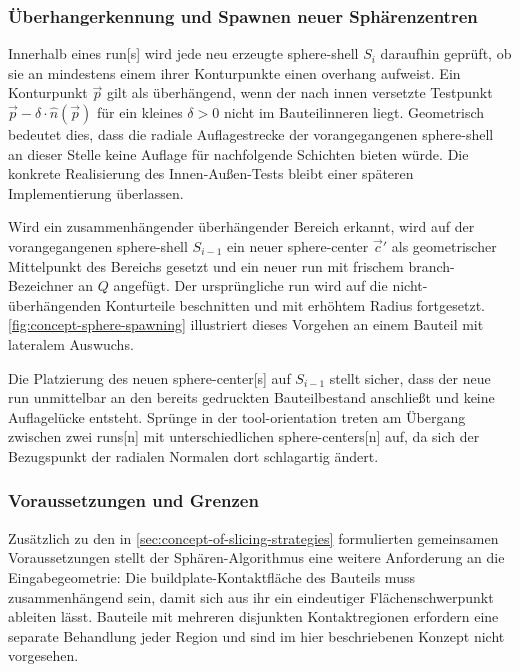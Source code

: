             \subsubsection{Überhangerkennung und Spawnen neuer Sphärenzentren}\label{subsubsec:concept-sphere-overhang-detection} 
                Innerhalb eines \gls{run}[s] wird jede neu erzeugte \gls{sphere-shell} $S_i$ daraufhin geprüft, ob sie an mindestens einem ihrer Konturpunkte einen \gls{overhang} aufweist.
                Ein Konturpunkt $\vec{p}$ gilt als überhängend, wenn der nach innen versetzte Testpunkt $\vec{p} - \delta \cdot \hat{n}(\vec{p})$ für ein kleines $\delta > 0$ nicht im Bauteilinneren liegt.
                Geometrisch bedeutet dies, dass die radiale Auflagestrecke der vorangegangenen \gls{sphere-shell} an dieser Stelle keine Auflage für nachfolgende Schichten bieten würde.
                Die konkrete Realisierung des Innen-Außen-Tests bleibt einer späteren Implementierung überlassen.

                Wird ein zusammenhängender überhängender Bereich erkannt, wird auf der vorangegangenen \gls{sphere-shell} $S_{i-1}$ ein neuer \gls{sphere-center} $\vec{c}'$ als geometrischer Mittelpunkt des Bereichs gesetzt und ein neuer \gls{run} mit frischem \gls{branch}-Bezeichner an $Q$ angefügt.
                Der ursprüngliche \gls{run} wird auf die nicht-überhängenden Konturteile beschnitten und mit erhöhtem Radius fortgesetzt.
                \cref{fig:concept-sphere-spawning} illustriert dieses Vorgehen an einem Bauteil mit lateralem Auswuchs.

                Die Platzierung des neuen \gls{sphere-center}[s] auf $S_{i-1}$ stellt sicher, dass der neue \gls{run} unmittelbar an den bereits gedruckten Bauteilbestand anschließt und keine Auflagelücke entsteht.
                Sprünge in der \gls{tool-orientation} treten am Übergang zwischen zwei \glspl{run}[n] mit unterschiedlichen \glspl{sphere-center}[n] auf, da sich der Bezugspunkt der radialen Normalen dort schlagartig ändert.

            \subsubsection{Voraussetzungen und Grenzen}\label{subsubsec:concept-sphere-assumptions-limits}
                Zusätzlich zu den in \cref{sec:concept-of-slicing-strategies} formulierten gemeinsamen Voraussetzungen stellt der Sphären-Algorithmus eine weitere Anforderung an die Eingabegeometrie:
                Die \gls{buildplate}-Kontaktfläche des Bauteils muss zusammenhängend sein, damit sich aus ihr ein eindeutiger Flächenschwerpunkt ableiten lässt.
                Bauteile mit mehreren disjunkten Kontaktregionen erfordern eine separate Behandlung jeder Region und sind im hier beschriebenen Konzept nicht vorgesehen.

